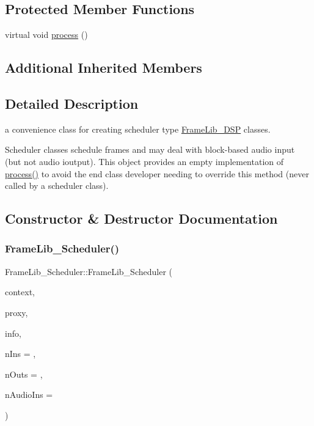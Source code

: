 \subsection*{Protected Member Functions}
\begin{DoxyCompactItemize}
\item 
virtual void \hyperlink{class_frame_lib___scheduler_aa5c10907d7d11e1beef86d19b8e93601}{process} ()
\end{DoxyCompactItemize}
\subsection*{Additional Inherited Members}


\subsection{Detailed Description}
a convenience class for creating scheduler type \hyperlink{class_frame_lib___d_s_p}{Frame\+Lib\+\_\+\+D\+SP} classes. 

Scheduler classes schedule frames and may deal with block-\/based audio input (but not audio ioutput). This object provides an empty implementation of \hyperlink{class_frame_lib___scheduler_aa5c10907d7d11e1beef86d19b8e93601}{process()} to avoid the end class developer needing to override this method (never called by a scheduler class). 

\subsection{Constructor \& Destructor Documentation}
\mbox{\label{class_frame_lib___scheduler_a72871bfcfe0243f0477f4abab334dd5a}} 
\subsubsection{\texorpdfstring{Frame\+Lib\+\_\+\+Scheduler()}{FrameLib\_Scheduler()}}
{\footnotesize\ttfamily Frame\+Lib\+\_\+\+Scheduler\+::\+Frame\+Lib\+\_\+\+Scheduler (\begin{DoxyParamCaption}\item[{\hyperlink{class_frame_lib___context}{Frame\+Lib\+\_\+\+Context}}]{context,  }\item[{\hyperlink{struct_frame_lib___proxy}{Frame\+Lib\+\_\+\+Proxy} $\ast$}]{proxy,  }\item[{\hyperlink{class_frame_lib___parameters_1_1_info}{Frame\+Lib\+\_\+\+Parameters\+::\+Info} $\ast$}]{info,  }\item[{unsigned long}]{n\+Ins = {},  }\item[{unsigned long}]{n\+Outs = {},  }\item[{unsigned long}]{n\+Audio\+Ins = {} }\end{DoxyParamCaption})\hspace{0.3cm}{\ttfamily [inline]}}



